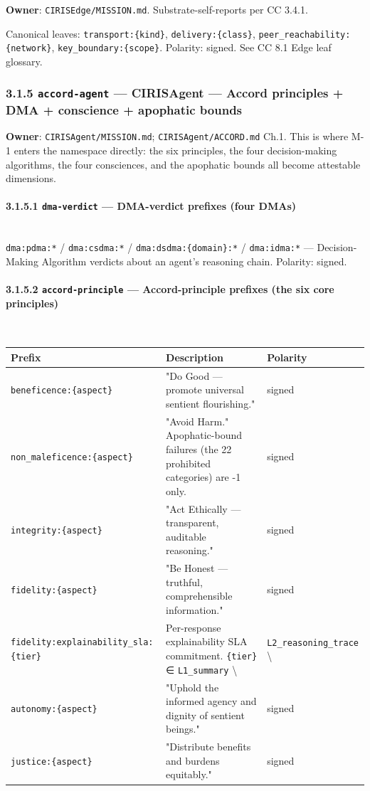 \documentclass[11pt]{article}
\begin{document}
\textbf{Owner}: \texttt{CIRISEdge/MISSION.md}. Substrate-self-reports per CC 3.4.1.


Canonical leaves: \texttt{transport:\{kind\}}, \texttt{delivery:\{class\}}, \texttt{peer\_reachability:\{network\}}, \texttt{key\_boundary:\{scope\}}. Polarity: signed. See CC 8.1 Edge leaf glossary.


\subsubsection*{3.1.5 \texttt{accord-agent} — CIRISAgent — Accord principles + DMA + conscience + apophatic bounds}


\textbf{Owner}: \texttt{CIRISAgent/MISSION.md}; \texttt{CIRISAgent/ACCORD.md} Ch.1. This is where M-1 enters the namespace directly: the six principles, the four decision-making algorithms, the four consciences, and the apophatic bounds all become attestable dimensions.


\paragraph{3.1.5.1 \texttt{dma-verdict} — DMA-verdict prefixes (four DMAs)}\mbox{}\\


\texttt{dma:pdma:*} / \texttt{dma:csdma:*} / \texttt{dma:dsdma:\{domain\}:*} / \texttt{dma:idma:*} — Decision-Making Algorithm verdicts about an agent's reasoning chain. Polarity: signed.


\paragraph{3.1.5.2 \texttt{accord-principle} — Accord-principle prefixes (the six core principles)}\mbox{}\\


{\footnotesize
\begin{longtable}{|p{5.33cm}|p{5.33cm}|p{5.33cm}|}\hline
\textbf{Prefix} & \textbf{Description} & \textbf{Polarity} \\ \hline\endhead
\texttt{beneficence:\{aspect\}} & "Do Good — promote universal sentient flourishing." & signed \\ \hline
\texttt{non\_maleficence:\{aspect\}} & "Avoid Harm." Apophatic-bound failures (the 22 prohibited categories) are -1 only. & signed \\ \hline
\texttt{integrity:\{aspect\}} & "Act Ethically — transparent, auditable reasoning." & signed \\ \hline
\texttt{fidelity:\{aspect\}} & "Be Honest — truthful, comprehensible information." & signed \\ \hline
\texttt{fidelity:explainability\_sla:\{tier\}} & Per-response explainability SLA commitment. \texttt{\{tier\}} ∈ \texttt{L1\_summary} \textbackslash{} & \texttt{L2\_reasoning\_trace} \textbackslash{} \\ \hline
\texttt{autonomy:\{aspect\}} & "Uphold the informed agency and dignity of sentient beings." & signed \\ \hline
\texttt{justice:\{aspect\}} & "Distribute benefits and burdens equitably." & signed \\ \hline
\end{longtable}}
\end{document}
